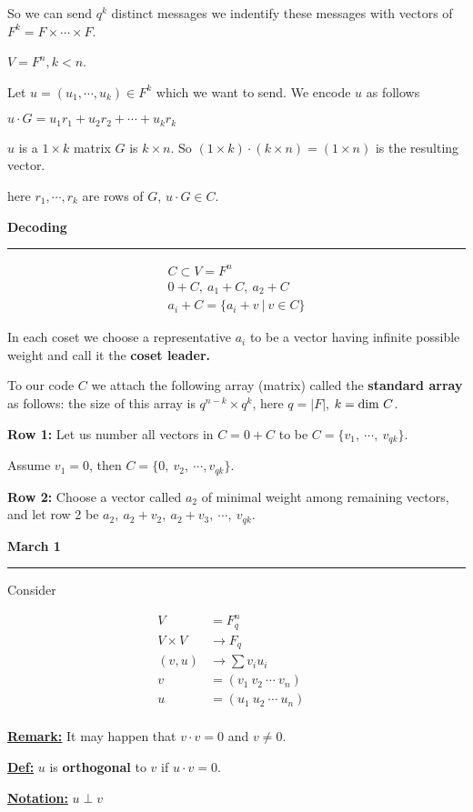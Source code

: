 \documentclass{article}
\newcommand{\header}[1]{
	\begin{Large}
	\noindent\textbf{#1}
	\vspace{2pt}
	\hrule
	\vspace{16pt}
	\end{Large}
	\normalsize
}
\newcommand{\eqs}[1]{
	\begin{gather*}
		#1
	\end{gather*}
}
\renewcommand{\b}[1]{\textbf{#1}}
\newcommand{\ul}[1]{\underline{#1}}
\renewcommand{\aligned}[1]{
	\begin{align*}
		#1
	\end{align*}
}
\newcommand{\newdef}[2]{\b{\ul{#1:}} #2}
\begin{document}
So we can send $q^k$ distinct messages we indentify these messages with vectors
of $F^k = F \times \cdots \times F$.

$V = F^n, k < n$.

Let $u = (u_1, \cdots, u_k) \in F^k$ which we want to send. We encode $u$ as
follows

$u \cdot G = u_1r_1 + u_2r_2 + \cdots + u_kr_k$

$u$ is a $1 \times k$ matrix $G$ is $k \times n$. So $(1 \times k) \cdot
	(k \times n) = (1 \times n)$ is the resulting vector.

here $r_1, \cdots, r_k$ are rows of $G$, $u\cdot G \in C$.

\header{Decoding}

\eqs{
	C \subset V = F^n \\
	0+C,\ a_1+C,\ a_2+C  \\
	a_i + C = \{a_i + v\ |\ v \in C\}
}

In each coset we choose a representative $a_i$ to be a vector having infinite
possible weight and call it the \textbf{coset leader.}

To our code $C$ we attach the following array (matrix) called the
\textbf{standard array} as follows: the size of this array is
$q^{n-k} \times q^k$, here $q = |F|$, $k = \textnormal{dim } C$.

\textbf{Row 1:} Let us number all vectors in $C = 0+C$ to be
$C = \{v_1,\ \cdots,\ v_{qk}\}$.

Assume $v_1 = 0$, then $C = \{0,\ v_2,\ \cdots, v_{qk}\}$.

\textbf{Row 2:} Choose a vector called $a_2$ of minimal weight among remaining
vectors, and let row 2 be $a_2,\ a_2+v_2,\ a_2+v_3,\ \cdots,\ v_{qk}$.

\header{March 1}

Consider
\aligned{
	V          & = F_q^n                   & \\
	V \times V & \rightarrow F_q             \\
	(v, u)     & \rightarrow \sum v_iu_i     \\
	v          & = (v_1\ v_2\ \cdots\ v_n)   \\
	u          & = (u_1\ u_2\ \cdots\ u_n)   \\
}
\newdef{Remark}{
	It may happen that $v \cdot v = 0$ and $v \neq 0$.
}

\newdef{Def}{$u$ is \textbf{orthogonal} to $v$ if $u \cdot v = 0$.}

\newdef{Notation}{$u \perp v$}
\end{document}
